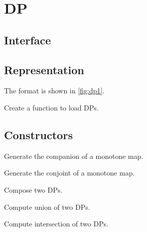 \section{DP}

\label{sec:exercises-DP}

\subsection*{Interface}

\subsection*{Representation}


The format is shown in \cref{fig:dp1}.


\begin{exercise}
  Create a function to load DPs.
%
\end{exercise}

\subsection*{Constructors}


\begin{exercise}
  Generate the companion of a monotone map.
%
\end{exercise}

\begin{exercise}
  Generate the conjoint of a monotone map.
%
%
\end{exercise}





\begin{exercise}
  Compose two DPs.
%
\end{exercise}

\begin{exercise}
  Compute union of two DPs.
%
\end{exercise}

\begin{exercise}
  Compute intersection of two DPs.
%
\end{exercise}


